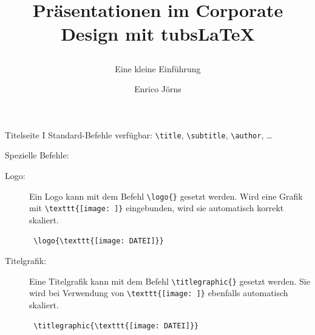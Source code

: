 \documentclass{beamer}
\newcommand{\tubslatex}{tubs\LaTeX}
\begin{document}
\title{\raggedright%
  Präsentationen im Corporate Design\newline
  mit \tubslatex}
\subtitle{Eine kleine Einführung}
\author{Enrico Jörns}

\begin{frame}[plain]
  \titlepage
\end{frame}

\begin{frame}[fragile]{Titelseite I}
Standard-Befehle verfügbar: \lstinline{\title}, \lstinline{\subtitle}, \lstinline{\author}, \ldots

Spezielle Befehle:
\begin{description}
  \item[Logo:]
    Ein Logo kann mit dem Befehl {\color{tuRed}\lstinline!\logo{}!} gesetzt werden.
    Wird eine Grafik mit \lstinline!\texttt{[image: ]}! eingebunden,
    wird sie automatisch korrekt skaliert.
    \begin{lstlisting}
 \logo{\texttt{[image: DATEI]}}
    \end{lstlisting}
  \item[Titelgrafik:]
    Eine Titelgrafik kann mit dem Befehl {\leavevmode\color{tuRed}\lstinline!\titlegraphic{}!} gesetzt werden.
    Sie wird bei Verwendung von \lstinline!\texttt{[image: ]}! ebenfalls automatisch skaliert.
    \begin{lstlisting}
 \titlegraphic{\texttt{[image: DATEI]}}
    \end{lstlisting}
\end{description}

\end{frame}
\end{document}
